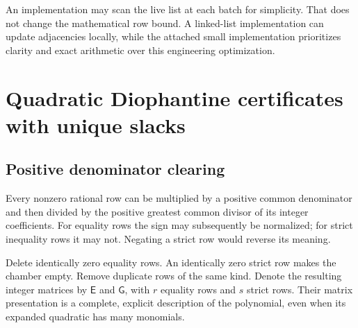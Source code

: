 \documentclass[11pt,letterpaper]{article}
\numberwithin{equation}{section}
\theoremstyle{definition}
\theoremstyle{remark}
\begin{document}
An implementation may scan the live list at each batch for simplicity.
That does not change the mathematical row bound. A linked-list implementation
can update adjacencies locally, while the attached small implementation
prioritizes clarity and exact arithmetic over this engineering optimization.

\section{Quadratic Diophantine certificates with unique slacks}
\label{smc:cg:sec:quadratic}

\subsection{Positive denominator clearing}

Every nonzero rational row can be multiplied by a positive common denominator
and then divided by the positive greatest common divisor of its integer
coefficients. For equality rows the sign may subsequently be normalized;
for strict inequality rows it may not. Negating a strict row would reverse
its meaning.

Delete identically zero equality rows. An identically zero strict row makes
the chamber empty. Remove duplicate rows of the same kind. Denote the
resulting integer matrices by $\mathsf E$ and $\mathsf G$, with $r$ equality
rows and $s$ strict rows. Their matrix presentation is a complete, explicit
description of the polynomial, even when its expanded quadratic has many
monomials.
\end{document}
